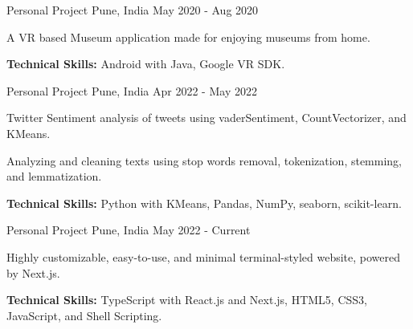 \begin{cventries}
  \cventry
    {Personal Project} %
    {} %
    {Pune, India} %
    {May 2020 - Aug 2020} %
    {
      \begin{cvitems} %
        \item {A VR based Museum application made for enjoying museums from home.}
        \item {\textbf{Technical Skills:} Android with Java, Google VR SDK.}
      \end{cvitems}
    }

  \cventry
    {Personal Project} %
    {} %
    {Pune, India} %
    {Apr 2022 - May 2022} %
    {
      \begin{cvitems} %
        \item {Twitter Sentiment analysis of tweets using vaderSentiment, CountVectorizer, and KMeans.}
        \item {Analyzing and cleaning texts using stop words removal, tokenization, stemming, and lemmatization.}
        \item {\textbf{Technical Skills:} Python with KMeans, Pandas, NumPy, seaborn, scikit-learn.}
      \end{cvitems}
    }

  \cventry
    {Personal Project} %
    {} %
    {Pune, India} %
    {May 2022 - Current} %
    {
      \begin{cvitems} %
        \item {Highly customizable, easy-to-use, and minimal terminal-styled website, powered by Next.js.}
        \item {\textbf{Technical Skills:} TypeScript with React.js and Next.js, HTML5, CSS3, JavaScript, and Shell Scripting.}
      \end{cvitems}
    }

\end{cventries}
